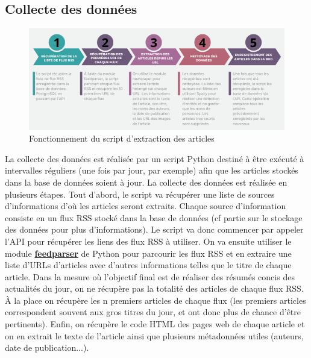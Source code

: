 \documentclass[french]{article}
\begin{document}
    \subsection{Collecte des données}
    \begin{figure}[h]
        \includegraphics[width=15cm]{fonctionnement_script}
        \centering
        \caption{Fonctionnement du script d'extraction des articles}
        \centering
    \end{figure}
    La collecte des données est réalisée par un script Python destiné à être exécuté à intervalles réguliers (une fois par jour, par exemple) afin que les articles stockés dans la base de données soient à jour.
    La collecte des données est réalisée en plusieurs étapes. Tout d'abord, le script va récupérer une liste de sources d'informations d'où les articles seront extraits. Chaque source d'information consiste en un flux RSS stocké dans la base de données (cf partie sur le stockage des données pour plus d'informations). Le script va donc commencer par appeler l'API pour récupérer les liens des flux RSS à utiliser.
    On va ensuite utiliser le module \textbf{\href{https://pypi.org/project/feedparser/}{feedparser}} de Python pour parcourir les flux RSS et en extraire une liste d'URLs d'articles avec d'autres informations telles que le titre de chaque article. Dans la mesure où l'objectif final est de réaliser des résumés concis des actualités du jour, on ne récupère pas la totalité des articles de chaque flux RSS. À la place on récupère les n premiers articles de chaque flux (les premiers articles correspondent souvent aux gros titres du jour, et ont donc plus de chance d'être pertinents).
    Enfin, on récupère le code HTML des pages web de chaque article et on en extrait le texte de l'article ainsi que plusieurs métadonnées utiles (auteurs, date de publication...). 
\end{document}
